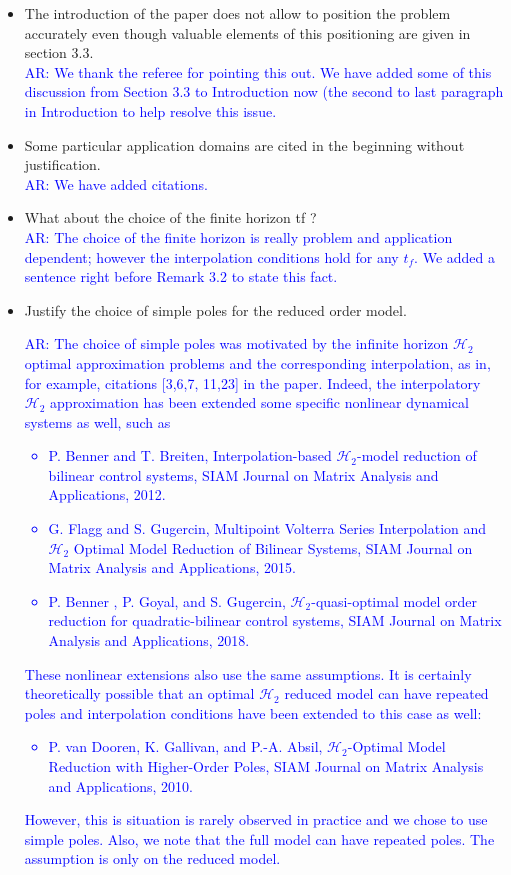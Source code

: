 \documentclass[11pt]{article}
\def\serkan#1{\textcolor{blue}{{#1}}}
\begin{document}
\begin{itemize}
\item The introduction of the paper does not allow to position the problem
accurately even though valuable elements of this positioning are given
in section 3.3. \\ [1ex]
\serkan{\textsf{AR}:  We thank the referee for pointing this out. We have added some of this discussion from Section 3.3 to Introduction now (the second to last paragraph in Introduction to help resolve this issue.}   

\item Some particular application domains are cited in the beginning without
justification. \\[1ex]
\serkan{\textsf{AR}:  We have added citations.}  
\item What about the choice of the finite horizon tf ? \\ [1ex]
\serkan{\textsf{AR}: The choice of the finite horizon is really problem and application dependent; however the interpolation conditions hold for any $t_f$. We added a sentence right before Remark 3.2 to state this fact.}

\item Justify the choice of simple poles for the reduced order model. \\ [1ex]
\serkan{\textsf{AR}:  The choice of simple poles was motivated by the infinite horizon $\mathcal{H}_2$ optimal approximation problems and the corresponding interpolation, as in, for example, citations [3,6,7, 11,23] in the paper. Indeed, the interpolatory $\mathcal{H}_2$  approximation has been extended some specific nonlinear dynamical systems as well, such as 
\begin{itemize}
\item   P. Benner and T. Breiten, Interpolation-based $\mathcal{H}_2$-model reduction of
                  bilinear control systems, SIAM Journal on Matrix Analysis and Applications, 2012.
\item  G. Flagg and S. Gugercin,  Multipoint Volterra Series Interpolation and $\mathcal{H}_2$ Optimal Model Reduction of Bilinear Systems, SIAM Journal on Matrix Analysis and Applications, 2015.
\item P. Benner , P. Goyal, and S. Gugercin, $\mathcal{H}_2$-quasi-optimal model order reduction for quadratic-bilinear control systems, SIAM Journal on Matrix Analysis and Applications, 2018.
\end{itemize}
These nonlinear extensions also use the same assumptions. It is certainly theoretically possible that an optimal $\mathcal{H}_2$ reduced model can have repeated poles and interpolation conditions have been extended to this case as well: 
\begin{itemize}
\item P. van Dooren, K. Gallivan, and  P.-A. Absil, 
$\mathcal{H}_2$-Optimal Model Reduction with Higher-Order Poles,
	SIAM Journal on Matrix Analysis and Applications, 2010.
\end{itemize}
However, this is situation is rarely observed in practice and we chose to use simple poles. Also, we note that the full model can have repeated poles. The assumption is only on the reduced model.
}  


\end{itemize}
\end{document}
